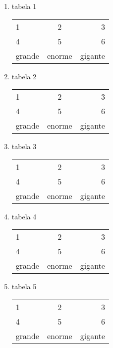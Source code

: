 \documentclass[10pt,a4paper]{report}
\author{Omeir o REI}
\begin{document}
\begin{enumerate}

\item tabela 1 \\
\begin{center}
\begin{tabular}{lcr}
1 & 2 & 3 \\ 
4 & 5 & 6 \\ 
grande & enorme & gigante \\ 
\end{tabular} 
\end{center}
\item tabela 2\\
\begin{center}
\begin{tabular}{l|cr}
1 & 2 & 3 \\ 
4 & 5 & 6 \\ 
grande & enorme & gigante \\ 
\end{tabular}
\end{center}

\item tabela 3\\
\begin{center}
\begin{tabular}{l|cr}
1 & 2 & 3 \\ 
4 & 5 & 6 \\ 
grande & enorme & gigante \\ 
\end{tabular}
\end{center}

\item tabela 4\\
\begin{center}
\begin{tabular}{|l|c|r}
1 & 2 & 3 \\ 
4 & 5 & 6 \\ 
grande & enorme & gigante \\ 
\end{tabular}
\end{center}


\item tabela 5\\
\begin{center}
\begin{tabular}{|l|c|r|}
1 & 2 & 3 \\ 
4 & 5 & 6 \\ 
grande & enorme & gigante \\ 
\end{tabular}
\end{center}



\end{enumerate}
\end{document}

